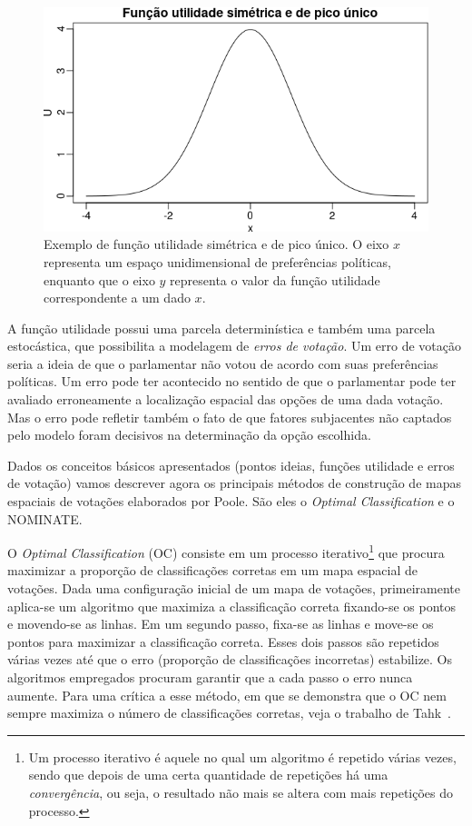 \documentclass[
	article,			%
	12pt,				%
	oneside,			%
	a4paper,			%
	english,			%
	brazil,				%
	sumario=tradicional,
	oldfontcommands %
	]{abntex2}
\begin{document}
\begin{figure}[h!]
  \centering
  \includegraphics[scale=0.6]{figs/funcao_utilidade.png}
  \caption{Exemplo de função utilidade simétrica e de pico único. O eixo $x$ representa um espaço unidimensional de preferências políticas, enquanto que o eixo $y$ representa o valor da função utilidade correspondente a um dado $x$.}
  \label{fig:funcao_utilidade}
\end{figure}

A função utilidade possui uma parcela determinística e também uma parcela estocástica, que possibilita a modelagem de \emph{erros de votação}. Um erro de votação seria a ideia de que o parlamentar não votou de acordo com suas preferências políticas. Um erro pode ter acontecido no sentido de que o parlamentar pode ter avaliado erroneamente a localização espacial das opções de uma dada votação. Mas o erro pode refletir também o fato de que fatores subjacentes não captados pelo modelo foram decisivos na determinação da opção escolhida.

Dados os conceitos básicos apresentados (pontos ideias, funções utilidade e erros de votação) vamos descrever agora os principais métodos de construção de mapas espaciais de votações elaborados por Poole. São eles o \emph{Optimal Classification} e o NOMINATE.

O \emph{Optimal Classification} (OC) consiste em um processo iterativo\footnote{Um processo iterativo é aquele no qual um algoritmo é repetido várias vezes, sendo que depois de uma certa quantidade de repetições há uma \emph{convergência}, ou seja, o resultado não mais se altera com mais repetições do processo.} que procura maximizar a proporção de classificações corretas em um mapa espacial de votações. Dada uma configuração inicial de um mapa de votações, primeiramente aplica-se um algoritmo que maximiza a classificação correta fixando-se os pontos e movendo-se as linhas. Em um segundo passo, fixa-se as linhas e move-se os pontos para maximizar a classificação correta. Esses dois passos são repetidos várias vezes até que o erro (proporção de classificações incorretas) estabilize. Os algoritmos empregados procuram garantir que a cada passo o erro nunca aumente. Para uma crítica a esse método, em que se demonstra que o OC nem sempre maximiza o número de classificações corretas, veja o trabalho de Tahk~\cite{tahk2006oc}.
\end{document}
